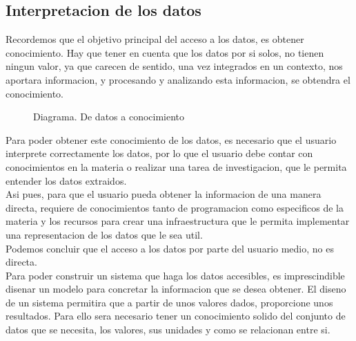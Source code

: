 \subsection{Interpretacion de los datos}

Recordemos que el objetivo principal del acceso a los datos, es obtener conocimiento. Hay que tener en 
cuenta que los datos por si solos, no tienen ningun valor, ya que carecen de sentido, una vez integrados en un contexto,
nos aportara informacion, y procesando y analizando esta informacion, se obtendra el conocimiento.\\
    
\begin{figure}[h]
    \centering 
      \caption{Diagrama. De datos a conocimiento}
    \end{figure}
 
Para poder obtener este conocimiento de los datos, es necesario que el usuario interprete correctamente los datos, por lo
que el usuario debe contar con conocimientos en la materia o realizar una tarea de investigacion, que le permita 
entender los datos extraidos. \\

Asi pues, para que el usuario pueda obtener la informacion de una manera directa, requiere de conocimientos tanto 
de programacion como especificos de la materia y los recursos para crear una infraestructura que le permita implementar 
una representacion de los datos que le sea util.\\

Podemos concluir que el acceso a los datos por parte del usuario medio, no es directa.\\

Para poder construir un sistema que haga los datos accesibles, es imprescindible disenar un modelo  para concretar la 
informacion que se desea obtener. El diseno de un sistema permitira que a partir de unos valores dados, proporcione unos resultados.
Para ello sera necesario tener un conocimiento solido del conjunto de datos que se necesita, los valores,
sus unidades y como se relacionan entre si.\\


